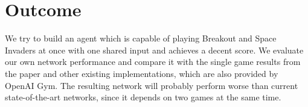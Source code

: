 \documentclass[10pt,twocolumn,letterpaper]{article}
\begin{document}
\section{Outcome}
We try to build an agent which is capable of playing Breakout and Space Invaders at once with one shared input and achieves a decent score. We evaluate our own network performance and compare it with the single game results from the paper and other existing implementations, which are also provided by OpenAI Gym. The resulting network will probably perform worse than current state-of-the-art networks, since it depends on two games at the same time.
    
{\small


}
\end{document}
